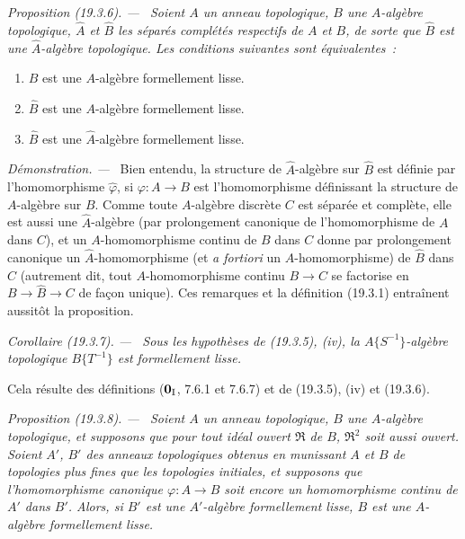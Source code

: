 \documentclass[10pt,oneside]{book}
\makeatletter
\newcommand{\setmanualcurrentlabel}[1]{\def\@currentlabel{#1}}
\newcommand{\oldpage}[2][]{%
  \setcounter{footnote}{0}%
  \marginpar{\scriptsize\textbf{#1}~|~#2}\ignorespaces}
\newenvironment{proposition}[1][]{%
  \setmanualcurrentlabel{#1}\par\medskip\noindent\itshape Proposition (#1). ---\ }{\par}
\newenvironment{corollary}[1][]{%
  \setmanualcurrentlabel{#1}\par\medskip\noindent\itshape Corollaire (#1). ---\ }{\par}
\newenvironment{proof}{%
  \par\medskip\noindent\textit{Démonstration. ---\ }}{\par}
\makeatother
\begin{document}
\oldpage[0\textsubscript{IV-1}]{83}

\begin{proposition}[19.3.6]
\label{0.19.3.6-fr}
Soient $A$ un anneau topologique, $B$ une $A$-algèbre topologique, $\hat A$
et $\hat B$ les séparés complétés respectifs de $A$ et $B$, de sorte que
$\hat B$ est une $\hat A$-algèbre topologique. Les conditions suivantes
sont équivalentes~:
\begin{enumerate}
  \item[a)] $B$ est une $A$-algèbre formellement lisse.
  \item[b)] $\hat B$ est une $A$-algèbre formellement lisse.
  \item[c)] $\hat B$ est une $\hat A$-algèbre formellement lisse.
\end{enumerate}
\end{proposition}

\begin{proof}
Bien entendu, la structure de $\hat A$-algèbre sur $\hat B$ est définie
par l'homomorphisme $\hat\varphi$, si $\varphi:A\to B$ est
l'homomorphisme définissant la structure de $A$-algèbre sur $B$. Comme toute
$A$-algèbre discrète $C$ est séparée et complète, elle est aussi une
$\hat A$-algèbre (par prolongement canonique de l'homomorphisme de $A$ dans
$C$), et un $A$-homomorphisme continu de $B$ dans $C$ donne par prolongement
canonique un $\hat A$-homomorphisme (et \emph{a fortiori} un
$A$-homomorphisme) de $\hat B$ dans $C$ (autrement dit, tout
$A$-homomorphisme continu $B\to C$ se factorise en $B\to\hat B\to C$ de façon
unique). Ces remarques et la définition (19.3.1) entraînent aussitôt la
proposition.
\end{proof}

\begin{corollary}[19.3.7]
\label{0.19.3.7-fr}
Sous les hypothèses de (19.3.5), (iv), la $A\{S^{-1}\}$-algèbre topologique
$B\{T^{-1}\}$ est formellement lisse.
\end{corollary}

Cela résulte des définitions ($\mathbf 0_{\rm I}$, 7.6.1 et 7.6.7) et de
(19.3.5), (iv) et (19.3.6).

\begin{proposition}[19.3.8]
\label{0.19.3.8-fr}
Soient $A$ un anneau topologique, $B$ une $A$-algèbre topologique, et supposons
que pour tout idéal ouvert $\mathfrak R$ de $B$, $\mathfrak R^2$ soit aussi
ouvert. Soient $A'$, $B'$ des anneaux topologiques obtenus en munissant $A$ et
$B$ de topologies plus fines que les topologies initiales, et supposons que
l'homomorphisme canonique $\varphi:A\to B$ soit encore un homomorphisme
continu de $A'$ dans $B'$. Alors, si $B'$ est une $A'$-algèbre formellement
lisse, $B$ est une $A$-algèbre formellement lisse.
\end{proposition}
\end{document}
